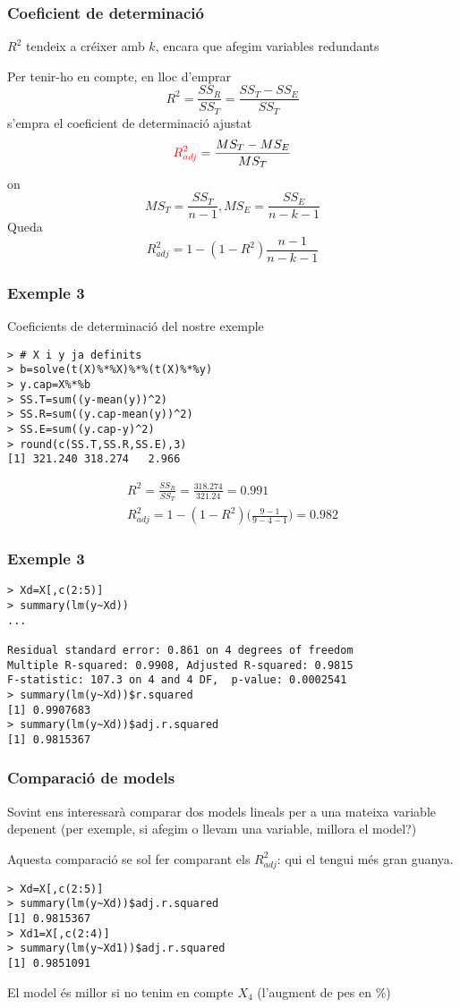 \documentclass[12pt,t]{beamer}
\newcommand{\red}[1]{\textcolor{red}{#1}}
\renewcommand{\emph}[1]{{\color{red}#1}}
\theoremstyle{plain}
\theoremstyle{definition}
\begin{document}
\begin{frame}
\frametitle{Coeficient de determinació}
\vspace*{-2ex}

$R^2$ tendeix a créixer amb $k$, encara que afegim variables redundants
\medskip

Per tenir-ho en compte, en lloc d'emprar
$$
R^2=\frac{SS_R}{SS_T}=\frac{SS_T-SS_E}{SS_T}
$$
s'empra el \emph{coeficient de determinació ajustat}
$$
\red{R^2_{adj}}=\frac{MS_T-MS_E}{MS_T}
$$
on 
$$
MS_T=\frac{SS_T}{n-1}, MS_E=\frac{SS_E}{n-k-1}
$$
Queda
$$
R^2_{adj}=1-(1-R^2)\frac{n-1}{n-k-1}
$$
\end{frame}

\begin{frame}[fragile]
\frametitle{Exemple 3}
\vspace*{-2ex}

Coeficients de determinació del nostre exemple
\begin{verbatim}
> # X i y ja definits
> b=solve(t(X)%*%X)%*%(t(X)%*%y)
> y.cap=X%*%b
> SS.T=sum((y-mean(y))^2)
> SS.R=sum((y.cap-mean(y))^2)
> SS.E=sum((y.cap-y)^2)
> round(c(SS.T,SS.R,SS.E),3)
[1] 321.240 318.274   2.966
\end{verbatim}
{\small $$
\begin{array}{l}
\displaystyle R^2=\frac{SS_R}{SS_T}=\frac{318.274}{321.24}=0.991\\[2ex]
\displaystyle R^2_{adj}=1-(1-R^2)\Big(\frac{9-1}{9-4-1}\Big)=0.982
\end{array}$$

}
\end{frame}

\begin{frame}[fragile]
\frametitle{Exemple 3}
\vspace*{-2ex}

\footnotesize \begin{verbatim}
> Xd=X[,c(2:5)]
> summary(lm(y~Xd))
...

Residual standard error: 0.861 on 4 degrees of freedom
Multiple R-squared: 0.9908,	Adjusted R-squared: 0.9815 
F-statistic: 107.3 on 4 and 4 DF,  p-value: 0.0002541 
> summary(lm(y~Xd))$r.squared
[1] 0.9907683
> summary(lm(y~Xd))$adj.r.squared
[1] 0.9815367
\end{verbatim}
\end{frame}

\begin{frame}[fragile]
\frametitle{Comparació de models}
Sovint ens interessarà comparar dos models lineals per a una mateixa variable depenent (per exemple, si afegim o llevam una variable, millora el model?)
\medskip

Aquesta comparació se sol fer comparant els $R^2_{adj}$: qui el tengui més gran guanya.
\begin{verbatim}
> Xd=X[,c(2:5)]
> summary(lm(y~Xd))$adj.r.squared
[1] 0.9815367
> Xd1=X[,c(2:4)]
> summary(lm(y~Xd1))$adj.r.squared
[1] 0.9851091
\end{verbatim}
El model és millor si  no tenim en compte $X_4$ (l'augment de pes en \%)
\end{frame}
\end{document}
